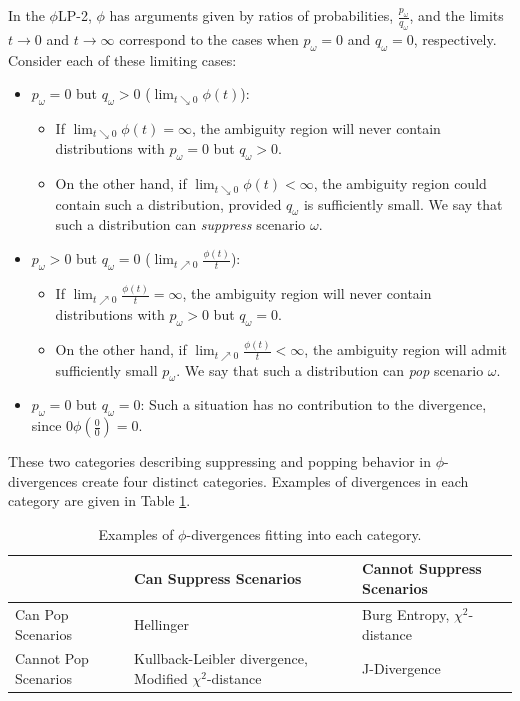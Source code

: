 \documentclass[11pt]{article}
\newcommand{\plp}{$\phi$LP-2}
\begin{document}
In the \plp, $\phi$ has arguments given by ratios of probabilities, $\tfrac{p_\omega}{q_\omega}$, and the limits $t \rightarrow 0$ and $t \rightarrow \infty$ correspond to the cases when $p_\omega = 0$ and $q_\omega = 0$, respectively.
Consider each of these limiting cases:
\begin{itemize}
	\item $p_\omega = 0$ but $q_\omega > 0$ ($\lim_{t \searrow 0} \phi(t)$):
	\begin{itemize}
		\item If $\lim_{t \searrow 0} \phi(t) = \infty$, the ambiguity region will never contain distributions with $p_\omega = 0$ but $q_\omega > 0$.
		\item On the other hand, if $\lim_{t \searrow 0} \phi(t) < \infty$, the ambiguity region could contain such a distribution, provided $q_\omega$ is sufficiently small.
			We say that such a distribution can \emph{suppress} scenario $\omega$.
	\end{itemize}
	\item $p_\omega > 0$ but $q_\omega = 0$ ($\lim_{t \nearrow 0} \frac{\phi(t)}{t}$):
	\begin{itemize}
		\item If $\lim_{t \nearrow 0} \frac{\phi(t)}{t} = \infty$, the ambiguity region will never contain distributions with $p_\omega > 0$ but $q_\omega = 0$.
		\item On the other hand, if $\lim_{t \nearrow 0} \frac{\phi(t)}{t} < \infty$, the ambiguity region will admit sufficiently small $p_\omega$.
			We say that such a distribution can \emph{pop} scenario $\omega$.
	\end{itemize}
	\item $p_\omega = 0$ but $q_\omega = 0$: Such a situation has no contribution to the divergence, since $0 \phi\left(\tfrac{0}{0}\right) = 0$.
\end{itemize}

These two categories describing suppressing and popping behavior in $\phi$-divergences create four distinct categories.
Examples of divergences in each category are given in Table \ref{tb:phi_categories}.

\begin{table}
	\centering
	\begin{tabular}{l|p{}p{}}
		 & Can Suppress Scenarios & Cannot Suppress Scenarios \\
		 \hline
		 Can Pop Scenarios %
			& \parbox{.3\textwidth}{Hellinger} %
			& \parbox{.3\textwidth}{Burg Entropy,\\$\chi^2$-distance} \\
		 Cannot Pop Scenarios %
			& \parbox{.3\textwidth}{Kullback-Leibler divergence,\\Modified $\chi^2$-distance} %
			& \parbox{.3\textwidth}{J-Divergence}
	\end{tabular}
	\caption{
		Examples of $\phi$-divergences fitting into each category.
	}
	\label{tb:phi_categories}
\end{table}
\end{document}
